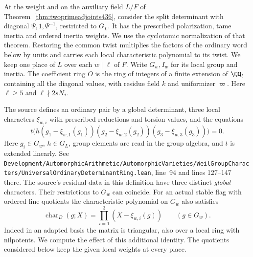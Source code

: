 \documentclass[a4paper,11pt]{article}
\theoremstyle{definition}
\theoremstyle{remark}
\newcommand{\srcloc}[2]{{\small\nolinkurl{#1.lean}}, line~#2}
\numberwithin{equation}{section}
\begin{document}
At the weight and on the auxiliary field \(L/F\) of
Theorem~\ref{thm:twoprimeadjoints436}, consider the split determinant
with diagonal \(\Psi,1,\Psi^{-1}\), restricted to \(G_L\).
It has the prescribed polarization, tame inertia and ordered
inertia weights. We use the cyclotomic normalization of that
theorem. Restoring the common twist multiplies the factors
of the ordinary word below by units and carries each local
characteristic polynomial to its twist. We keep one place of \(L\) over each \(w\mid\ell\)
of \(F\). Write \(G_w,I_w\) for its local group and inertia.
The coefficient ring \(O\) is the ring of integers of a finite
extension of \(\QQ_\ell\) containing all the diagonal values,
with residue field \(k\) and uniformizer \(\varpi\).
Here \(\ell\ge5\) and \(\ell\nmid 2sN_*\).

The source defines an ordinary pair by a global determinant,
three local characters \(\xi_{w,i}\) with prescribed reductions
and torsion values, and the equations
\begin{equation}
  t\bigl(h(g_1-\xi_{w,1}(g_1))
           (g_2-\xi_{w,2}(g_2))(g_3-\xi_{w,3}(g_3))\bigr)=0 .
  \label{eq:ordinaryword438}
\end{equation}
Here \(g_i\in G_w\), \(h\in G_L\), group elements are read in
the group algebra, and \(t\) is extended linearly. See
\srcloc{Development/AutomorphicArithmetic/AutomorphicVarieties/WeilGroupCharacters/UniversalOrdinaryDeterminantRing}{94}
and lines 127--147 there. The source's residual data in this
definition have three distinct \emph{global} characters. Their
restrictions to \(G_w\) can coincide. For an actual stable
flag with ordered line quotients the characteristic polynomial
on \(G_w\) also satisfies
\begin{equation}
  \operatorname{char}_{D}(g;X)
         =\prod_{i=1}^3(X-\xi_{w,i}(g))\qquad (g\in G_w).
  \label{eq:factorlocal438}
\end{equation}
Indeed in an adapted basis the matrix is triangular, also over
a local ring with nilpotents. We compute the effect of this
additional identity. The quotients considered below keep the
given local weights at every place.
\end{document}
